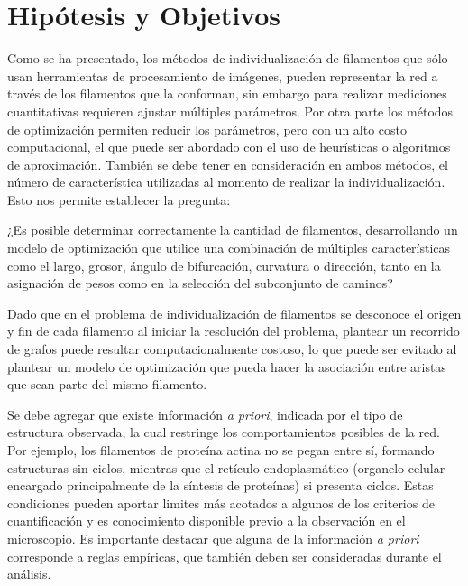 \section{Hip\'otesis y Objetivos}
Como se ha presentado, los m\'etodos de individualizaci\'on de filamentos que s\'olo usan herramientas de procesamiento de im\'agenes, pueden representar la red a trav\'es de los filamentos que la conforman, sin embargo para realizar mediciones cuantitativas requieren ajustar m\'ultiples par\'ametros. Por otra parte los m\'etodos de optimizaci\'on permiten reducir los par\'ametros, pero con un alto costo computacional, el que puede ser abordado con el uso de heur\'isticas o algoritmos de aproximaci\'on. Tambi\'en se debe tener en consideraci\'on en ambos m\'etodos, el n\'umero de caracter\'istica utilizadas al momento de realizar la individualizaci\'on. Esto nos permite establecer la pregunta:

\smallskip
¿Es posible determinar correctamente la cantidad de filamentos, desarrollando un modelo de optimizaci\'on que utilice una combinaci\'on de m\'ultiples caracter\'isticas como el largo, grosor, \'angulo de bifurcaci\'on, curvatura o direcci\'on, tanto en la asignaci\'on de pesos como en la selecci\'on del subconjunto de caminos?
\smallskip


Dado que en el problema de individualizaci\'on de filamentos se desconoce el origen y fin de cada filamento al iniciar la resoluci\'on del problema, plantear un recorrido de grafos puede resultar computacionalmente costoso, lo que puede ser evitado al plantear un modelo de optimizaci\'on que pueda hacer la asociaci\'on entre aristas que sean parte del mismo filamento.

Se debe agregar que existe informaci\'on \textit{a priori}, indicada por el tipo de estructura observada, la cual restringe los comportamientos posibles de la red. Por ejemplo, los filamentos de prote\'ina actina no se pegan entre s\'i, formando estructuras sin ciclos, mientras que el ret\'iculo endoplasm\'atico (organelo celular encargado principalmente de la s\'intesis de prote\'inas) si presenta ciclos. Estas condiciones pueden aportar limites m\'as acotados a algunos de los criterios de cuantificaci\'on y es conocimiento disponible previo a la observaci\'on en el microscopio. Es importante destacar que alguna de la informaci\'on {\it a priori} corresponde a reglas emp\'iricas, que tambi\'en deben ser consideradas durante el an\'alisis.

